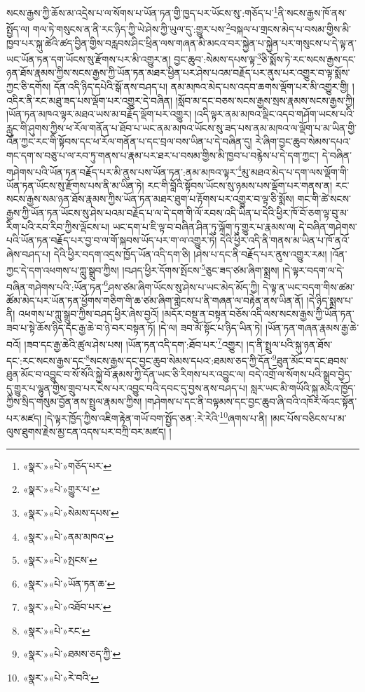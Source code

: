 སངས་རྒྱས་ཀྱི་ཆོས་མ་འདྲེས་པ་ལ་སོགས་པ་ཡོན་ཏན་གྱི་ཁྱད་པར་ཡོངས་སུ་:གཅོད་པ་\footnote{«སྣར་»«པེ་»གཅོད་པར་}ནི་སངས་རྒྱས་ཁོ་ནས་སྤྱོད་ལ། གལ་ཏེ་གསུངས་ན་ནི་རང་ཉིད་ཀྱི་ཡེ་ཤེས་ཀྱི་ཡུལ་དུ་:གྱུར་པས་\footnote{«སྣར་»«པེ་»གྱུར་པ་}བསྐལ་པ་གྲངས་མེད་པ་བསམ་གྱིས་མི་ཁྱབ་པར་སྐུ་ཚེའི་ཚད་བྱིན་གྱིས་བརླབས་ཤིང་ཕྲིན་ལས་གཞན་མི་མངའ་བར་སྐྱེན་པ་སྐྱེན་པར་གསུངས་པ་དེ་ལྟ་ན་ཡང་ཡོན་ཏན་དག་ཡོངས་སུ་རྫོགས་པར་མི་འགྱུར་ན། བྱང་ཆུབ་:སེམས་དཔས་ལྟ་\footnote{«སྣར་»«པེ་»སེམས་དཔས་}ཅི་སྨོས་ཏེ་རང་སངས་རྒྱས་དང་ཉན་ཐོས་རྣམས་ཀྱིས་སངས་རྒྱས་ཀྱི་ཡོན་ཏན་མཐར་ཕྱིན་པར་ཤེས་པའམ་བརྗོད་པར་ནུས་པར་འགྱུར་བ་ལྟ་སྨོས་ཀྱང་ཅི་དགོས། དོན་འདི་ཉིད་དཔེའི་སྒོ་ནས་བཤད་པ། ནམ་མཁའ་མེད་པས་འདབ་ཆགས་ལྡོག་པར་མི་འགྱུར་གྱི། །འདིར་ནི་རང་མཐུ་ཟད་པས་ལྡོག་པར་འགྱུར་དེ་བཞིན། །སློབ་མ་དང་བཅས་སངས་རྒྱས་སྲས་རྣམས་སངས་རྒྱས་ཀྱི། །ཡོན་ཏན་མཁའ་ལྟར་མཐའ་ཡས་མ་བརྗོད་ལྡོག་པར་འགྱུར། །འདི་ལྟར་ནམ་མཁའ་ལྡིང་འདབ་གཤོག་ཡངས་པའི་རླུང་གི་ཤུགས་ཀྱིས་ཕ་རོལ་གནོན་པ་ཐོབ་པ་ཡང་ནམ་མཁའ་ཡོངས་སུ་ཟད་པས་ནམ་མཁའ་ལ་ལྡོག་པ་མ་ཡིན་གྱི་འོན་ཀྱང་རང་གི་སྟོབས་དང་ཕ་རོལ་གནོན་པ་དང་བྲལ་བས་ཡིན་པ་དེ་བཞིན་དུ། རེ་ཞིག་བྱང་ཆུབ་སེམས་དཔའ་གང་དག་ས་བཅུ་པ་ལ་རབ་ཏུ་གནས་པ་རྣམ་པར་ཐར་པ་བསམ་གྱིས་མི་ཁྱབ་པ་བརྙེས་པ་དེ་དག་ཀྱང་། དེ་བཞིན་གཤེགས་པའི་ཡོན་ཏན་བརྗོད་པར་མི་ནུས་པས་ཡོན་ཏན་:ནམ་མཁའ་ལྟར་\footnote{«སྣར་»«པེ་»ནམ་མཁའ་}མུ་མཐའ་མེད་པ་དག་ལས་ལྡོག་གི་ཡོན་ཏན་ཡོངས་སུ་རྫོགས་པས་ནི་མ་ཡིན་ཏེ། རང་གི་བློའི་སྟོབས་ཡོངས་སུ་ཉམས་པས་ལྡོག་པར་གནས་ན། རང་སངས་རྒྱས་སམ་ཉན་ཐོས་རྣམས་ཀྱིས་ཡོན་ཏན་མཐར་ཐུག་པ་རྟོགས་པར་འགྱུར་བ་ལྟ་ཅི་སྨོས། གང་གི་ཚེ་སངས་རྒྱས་ཀྱི་ཡོན་ཏན་ཡོངས་སུ་ཤེས་པའམ་བརྗོད་པ་ལ་དེ་དག་གི་ལོ་རབས་འདི་ཡིན་པ་དེའི་ཕྱིར་ཁོ་བོ་ཅག་ལྟ་བུ་མ་རིག་པའི་རབ་རིབ་ཀྱིས་ལྡོངས་པ། ཡང་དག་པ་ཇི་ལྟ་བ་བཞིན་ཤིན་ཏུ་ལྐོག་ཏུ་གྱུར་པ་རྣམས་ལ། དེ་བཞིན་གཤེགས་པའི་ཡོན་ཏན་བརྗོད་པར་བྱ་བ་ལ་གོ་སྐབས་ཡོད་པར་ག་ལ་འགྱུར་ཏེ། དེའི་ཕྱིར་འདི་ནི་གནས་མ་ཡིན་པ་ཁོ་ནའོ་ཞེས་བཤད་པ། དེའི་ཕྱིར་བདག་འདྲས་ཁྱོད་ཡོན་འདི་དག་ཅི། །ཤེས་པ་དང་ནི་བརྗོད་པར་ནུས་འགྱུར་རམ། །འོན་ཀྱང་དེ་དག་འཕགས་པ་ཀླུ་སྒྲུབ་ཀྱིས། །བཤད་ཕྱིར་དོགས་སྤོངས་\footnote{«སྣར་»«པེ་»སྤངས་}ཅུང་ཟད་ཙམ་ཞིག་སྨྲས། །དེ་ལྟར་བདག་ལ་དེ་བཞིན་གཤེགས་པའི་:ཡོན་ཏན་\footnote{«སྣར་»«པེ་»ཡོན་ཏན་ཆ་}ཤས་ཙམ་ཞིག་ཡོངས་སུ་ཤེས་པ་ཡང་མེད་མོད་ཀྱི། དེ་ལྟ་ན་ཡང་བདག་གིས་ཚམ་ཚོམ་མེད་པར་ཡོན་ཏན་ཕྱོགས་གཅིག་གི་ཆ་ཙམ་ཞིག་གླེངས་པ་ནི་གཞན་ལ་བརྟེན་ནས་ཡིན་ནོ། །དེ་ཉིད་སྨྲས་པ་ནི། འཕགས་པ་ཀླུ་སྒྲུབ་ཀྱིས་བཤད་ཕྱིར་ཞེས་བྱའོ། །མདོར་བསྡུ་ན་བསྟན་བཅོས་འདི་ལས་སངས་རྒྱས་ཀྱི་ཡོན་ཏན་ཟབ་པ་སྟེ་ཆོས་ཉིད་དང་རྒྱ་ཆེ་བ་ཉེ་བར་བསྟན་ཏོ། །དེ་ལ། ཟབ་མོ་སྟོང་པ་ཉིད་ཡིན་ཏེ། །ཡོན་ཏན་གཞན་རྣམས་རྒྱ་ཆེ་བའོ། །ཟབ་དང་རྒྱ་ཆེའི་ཚུལ་ཤེས་པས། །ཡོན་ཏན་འདི་དག་:ཐོབ་པར་\footnote{«སྣར་»«པེ་»འཐོབ་པར་}འགྱུར། །ད་ནི་སྤྲུལ་པའི་སྐུ་ཉན་ཐོས་དང་:རང་སངས་རྒྱས་དང་\footnote{«སྣར་»«པེ་»རང་}སངས་རྒྱས་དང་བྱང་ཆུབ་སེམས་དཔའ་:ཐམས་ཅད་ཀྱི་དོན་\footnote{«སྣར་»«པེ་»ཐམས་ཅད་ཀྱི་}ཐུན་མོང་བ་དང་ཐབས་ཐུན་མོང་བ་འབྱུང་བ་སོ་སོའི་སྐྱེ་བོ་རྣམས་ཀྱི་དོན་ཡང་ཅི་རིགས་པར་འབྱུང་ལ། བདེ་འགྲོ་ལ་སོགས་པའི་སྒྲུབ་བྱེད་དུ་གྱུར་པ་ལྷུན་གྱིས་གྲུབ་པར་ངེས་པར་འབྱུང་བའི་དབང་དུ་བྱས་ནས་བཤད་པ། སླར་ཡང་མི་གཡོའི་སྐུ་མངའ་ཁྱོད་ཀྱིས་སྲིད་གསུམ་བྱོན་ནས་སྤྲུལ་རྣམས་ཀྱིས། །གཤེགས་པ་དང་ནི་བལྟམས་དང་བྱང་ཆུབ་ཞི་བའི་འཁོར་ལོའང་སྟོན་པར་མཛད། །དེ་ལྟར་ཁྱོད་ཀྱིས་འཇིག་རྟེན་གཡོ་བག་སྤྱོད་ཅན་:རེ་རེའི་\footnote{«སྣར་»«པེ་»རེ་བའི་}ཞགས་པ་ནི། །མང་པོས་བཅིངས་པ་མ་ལུས་ཐུགས་རྗེས་མྱ་ངན་འདས་པར་བཀྲི་བར་མཛད། །
